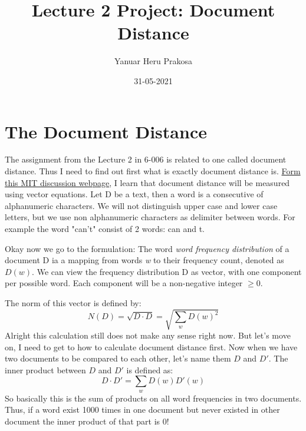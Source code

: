 \documentclass{article}
\title{Lecture 2 Project: Document Distance}
\author{Yanuar Heru Prakosa}
\date{31-05-2021}
\begin{document}
    \maketitle

    \section*{The Document Distance}
    The assignment from the Lecture 2 in 6-006 is related to one called document distance. 
    Thus I need to find out first what is exactly document distance is.  
    \href{http://6.006.scripts.mit.edu/~6.006/spring08/wiki/index.php?title=Document_Distance_Problem_Definition}{Form this MIT discussion webpage}, I learn that document distance will be measured using vector equations.
    Let D be a text, then a word is a consecutive of alphanumeric characters. 
    We will not distinguish upper case and lower case letters, but we use non alphanumeric characters as delimiter between words.
    For example the word "can't" consist of 2 words: can and t.
    
    Okay now we go to the formulation:
    The word \emph{word frequency distribution} of a document D ia a mapping from words \emph{w} to their frequency count, denoted as $D(w)$.
    We can view the frequency distribution D as vector, with one component per possible word. Each component will be a non-negative integer $\geq 0$.

    The norm of this vector is defined by:
    \begin{equation*}
        N(D) = \sqrt{D \cdot D} = \sqrt{\sum_{w}{D(w)^{2}}}
    \end{equation*}
    Alright this calculation still does not make any sense right now.
    But let's move on, I need to get to how to calculate document distance first.
    Now when we have two documents to be compared to each other, let's name them $D$ and $D'$. 
    The inner product between $D$ and $D'$ is defined as:
    \begin{equation*}
        D \cdot D' = \sum_{w}{D(w)D'(w)}
    \end{equation*}
    So basically this is the sum of products on all word frequencies in two documents.
    Thus, if a word exist 1000 times in one document but never existed in other document the inner product of that part is 0!
\end{document}
